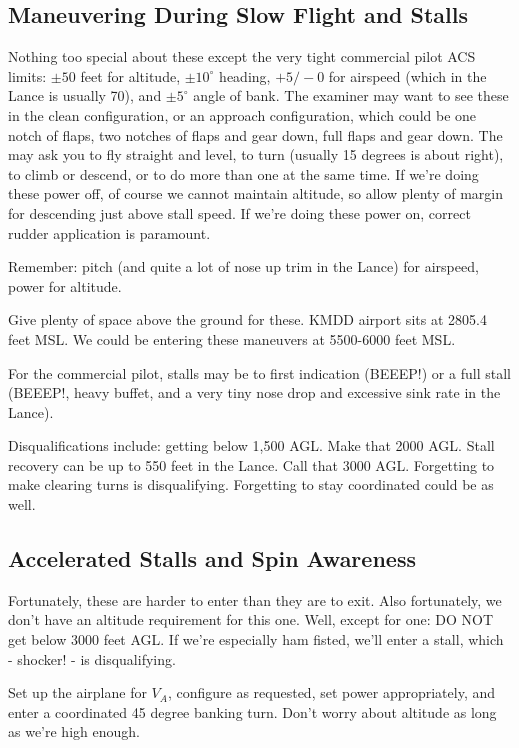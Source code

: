 \subsection{Maneuvering During Slow Flight and Stalls}

Nothing too special about these except the very tight commercial pilot ACS limits: $\pm50$ feet for altitude, $\pm10^\circ$ heading, $+5/-0$ for airspeed (which in the Lance is usually 70), and $\pm5^\circ$ angle of bank. The examiner may want to see these in the clean configuration, or an approach configuration, which could be one notch of flaps, two notches of flaps and gear down, full flaps and gear down. The may ask you to fly straight and level, to turn (usually 15 degrees is about right), to climb or descend, or to do more than one at the same time. If we're doing these power off, of course we cannot maintain altitude, so allow plenty of margin for descending just above stall speed. If we're doing these power on, correct rudder application is paramount.

Remember: pitch (and quite a lot of nose up trim in the Lance) for airspeed, power for altitude.

Give plenty of space above the ground for these. KMDD airport sits at 2805.4 feet MSL. We could be entering these maneuvers at 5500-6000 feet MSL.

For the commercial pilot, stalls may be to first indication (BEEEP!) or a full stall (BEEEP!, heavy buffet, and a very tiny nose drop and excessive sink rate in the Lance).

Disqualifications include: getting below 1,500 AGL. Make that 2000 AGL. Stall recovery can be up to 550 feet in the Lance. Call that 3000 AGL. Forgetting to make clearing turns is disqualifying. Forgetting to stay coordinated could be as well.

\subsection{Accelerated Stalls and Spin Awareness}

Fortunately, these are harder to enter than they are to exit. Also fortunately, we don't have an altitude requirement for this one. Well, except for one: DO NOT get below 3000 feet AGL. If we're especially ham fisted, we'll enter a stall, which - shocker! - is disqualifying.

Set up the airplane for $V_A$, configure as requested, set power appropriately, and enter a coordinated 45 degree banking turn. Don't worry about altitude as long as we're high enough.

